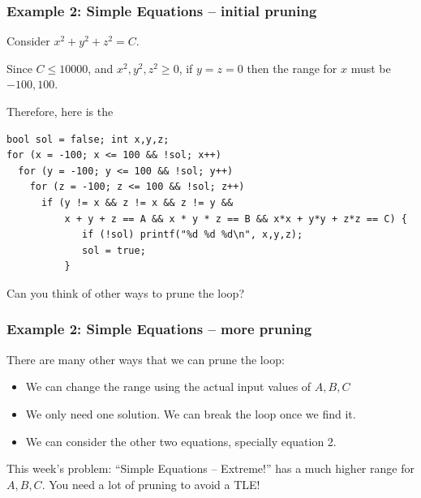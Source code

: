 \documentclass{beamer}
\begin{document}

\begin{frame}[fragile]
  \frametitle{Example 2: Simple Equations -- initial pruning}

  \begin{block}{}
    Consider $x^2 + y^2 + z^2 = C$.

    Since $C \leq 10000$, and $x^2,y^2,z^2 \geq 0$, if $y =
    z = 0$ then the range for $x$ must be $-100, 100$.
    
    \bigskip

    Therefore, here is the     
  \end{block}

{\smaller
\begin{verbatim}
bool sol = false; int x,y,z;
for (x = -100; x <= 100 && !sol; x++)
  for (y = -100; y <= 100 && !sol; y++)
    for (z = -100; z <= 100 && !sol; z++)
      if (y != x && z != x && z != y &&
          x + y + z == A && x * y * z == B && x*x + y*y + z*z == C) {
             if (!sol) printf("%d %d %d\n", x,y,z);
             sol = true;
          }
\end{verbatim}

\begin{block}{}
  Can you think of other ways to prune the loop?

  
\end{block}
}
\end{frame}

\begin{frame}
  \frametitle{Example 2: Simple Equations -- more pruning}
  There are many other ways that we can prune the loop:

  \medskip

  \begin{itemize}
  \item We can change the range using the actual input values of $A,B,C$
  \item We only need one solution. We can break the loop once we find it.
  \item We can consider the other two equations, specially equation 2.
  \end{itemize}

  \vfill

  \begin{alertblock}{}
    This week's problem: ``Simple Equations -- Extreme!'' has a much
    higher range for $A,B,C$. You need a lot of pruning to avoid a TLE!
  \end{alertblock}
\end{frame}
\end{document}
